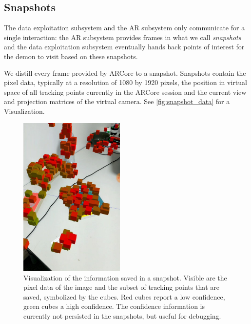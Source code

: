 \subsection{Snapshots}
\label{sec:snapshots}
The data exploitation subsystem and the AR subsystem only communicate for a single interaction: the AR subsystem provides frames in what we call \emph{snapshots} and the data exploitation subsystem eventually hands back points of interest for the demon to visit based on these snapshots.

We distill every frame provided by ARCore to a snapshot.
Snapshots contain the pixel data, typically at a resolution of 1080 by 1920 pixels, the position in virtual space of all tracking points currently in the ARCore session and the current view and projection matrices of the virtual camera. See  \autoref{fig:snapshot_data} for a Visualization.

\begin{figure}
    \centering
    \includegraphics[height=8cm]{graphics/snapshot-points.jpg}
    \caption{Visualization of the information saved in a snapshot. Visible are the pixel data of the image and the subset of tracking points that are saved, symbolized by the cubes. Red cubes report a low confidence, green cubes a high confidence. The confidence information is currently not persisted in the snapshots, but useful for debugging.}
    \label{fig:snapshot_data}
\end{figure}

